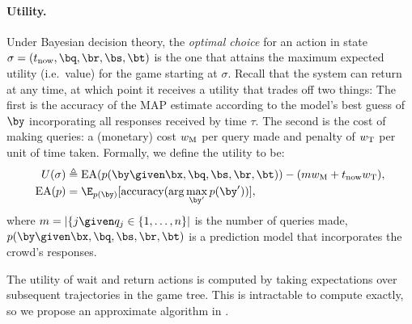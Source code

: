 \paragraph{Utility.}
Under Bayesian decision theory, the \emph{optimal choice} for an action in state $\sigma = (\now, \bq, \br, \bs, \bt)$ is the one that attains the maximum expected utility (i.e.\ value) for the game starting at $\sigma$.
Recall that the system can return at any time, at which point it receives a utility
that trades off two things:
The first is the accuracy of the MAP estimate according to the model's best guess of $\by$ incorporating all responses received by time $\tau$.
The second is the cost of making queries: a (monetary) cost $w_\text{M}$ per query made and penalty of $w_\text{T}$ per unit of time taken.
Formally, we define the utility to be:
\begin{align}
  \label{eqn:utility}
  U(\sigma) &\eqdef \text{EA}(p(\by \given \bx, \bq, \bs, \br, \bt)) - (m \weightmoney + \now \weighttime), \\
  \text{EA}(p) &= \E_{p(\by)}[\accuracy(\arg\max_{\by'} p(\by'))],
\end{align}
where $m = |\{j \given q_j \in \{1, \ldots, n\}|$ is the number of queries made,
$p(\by \given \bx, \bq, \bs, \br, \bt)$ is a prediction model that incorporates the crowd's responses.

The utility of wait and return actions is computed by taking expectations over subsequent trajectories in the game tree. 
This is intractable to compute exactly, so we propose an approximate algorithm in .

%
%

